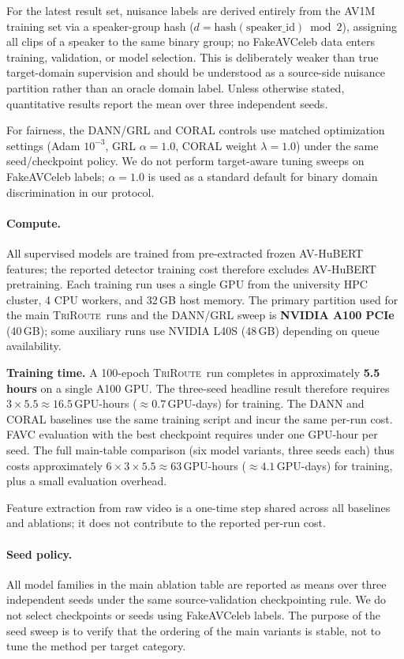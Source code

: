 \documentclass{article}
\newcommand{\method}{\textsc{TriRoute}}
\begin{document}
For the latest result set, nuisance labels are derived entirely from the AV1M training set via a speaker-group hash ($d = \mathrm{hash}(\mathrm{speaker\_id})\bmod 2$), assigning all clips of a speaker to the same binary group; no FakeAVCeleb data enters training, validation, or model selection. This is deliberately weaker than true target-domain supervision and should be understood as a source-side nuisance partition rather than an oracle domain label. Unless otherwise stated, quantitative results report the mean over three independent seeds.

For fairness, the DANN/GRL and CORAL controls use matched optimization settings (Adam $10^{-3}$, GRL $\alpha{=}1.0$, CORAL weight $\lambda{=}1.0$) under the same seed/checkpoint policy. We do not perform target-aware tuning sweeps on FakeAVCeleb labels; $\alpha{=}1.0$ is used as a standard default for binary domain discrimination in our protocol.
\paragraph{Compute.}
All supervised models are trained from pre-extracted frozen AV-HuBERT features; the reported detector training cost therefore excludes AV-HuBERT pretraining. Each training run uses a single GPU from the university HPC cluster, 4 CPU workers, and 32\,GB host memory. The primary partition used for the main \method\ runs and the DANN/GRL sweep is \textbf{NVIDIA A100 PCIe} (40\,GB); some auxiliary runs use NVIDIA L40S (48\,GB) depending on queue availability.

\textbf{Training time.} A 100-epoch \method\ run completes in approximately \textbf{5.5\,hours} on a single A100 GPU. The three-seed headline result therefore requires $3 \times 5.5 \approx \mathbf{16.5}$\,GPU-hours (${\approx}0.7$\,GPU-days) for training. The DANN and CORAL baselines use the same training script and incur the same per-run cost. FAVC evaluation with the best checkpoint requires under one GPU-hour per seed. The full main-table comparison (six model variants, three seeds each) thus costs approximately $6 \times 3 \times 5.5 \approx 63$\,GPU-hours (${\approx}4.1$\,GPU-days) for training, plus a small evaluation overhead.

Feature extraction from raw video is a one-time step shared across all baselines and ablations; it does not contribute to the reported per-run cost.

\paragraph{Seed policy.}
All model families in the main ablation table are reported as means over three independent seeds under the same source-validation checkpointing rule. We do not select checkpoints or seeds using FakeAVCeleb labels. The purpose of the seed sweep is to verify that the ordering of the main variants is stable, not to tune the method per target category.
\end{document}
